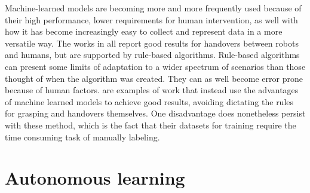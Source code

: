 Machine-learned models are becoming more and more frequently used because of their high performance, lower requirements for human intervention, as well with how it has become increasingly easy to collect and represent data in a more versatile way. The works in \parencite{Aleotti2012} \parencite{Suay2015} \parencite{Kim2004} all report good results for handovers between robots and humans, but are supported by rule-based algorithms. Rule-based algorithms can present some limits of adaptation to a wider spectrum of scenarios than those thought of when the algorithm was created. They can as well become error prone because of human factors. \parencite{Redmon2014} \parencite{Lenz2015} \parencite{Jiang2011} \parencite{Huebner2008a} are examples of work that instead use the advantages of machine learned models to achieve good results, avoiding dictating the rules for grasping and handovers themselves. One disadvantage does nonetheless persist with these method, which is the fact that their datasets for training require the time consuming task of manually labeling.

\section{Autonomous learning}
